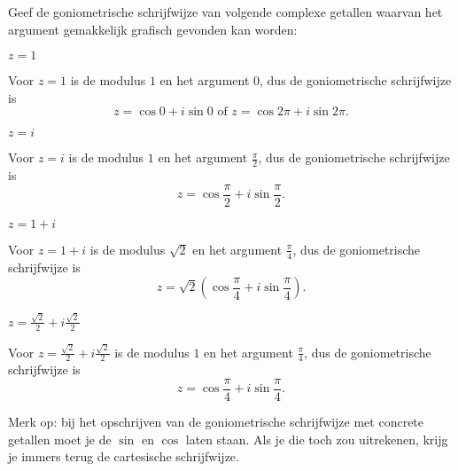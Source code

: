 \documentclass{ximera}
\begin{document}
\begin{exercise}\nl
    Geef de goniometrische schrijfwijze van volgende complexe getallen waarvan het argument gemakkelijk grafisch gevonden kan worden:
    \begin{question} $z=1 $
        \begin{oplossing}
          Voor $z=1 $ is de modulus $1$ en het argument $0$, dus de goniometrische schrijfwijze is $$z= \cos 0 + i\sin 0 \text{  of  } z= \cos 2\pi + i\sin 2\pi.$$
        \end{oplossing}
    \end{question}
\begin{question} $z=i $
    \begin{oplossing}
     Voor $z=i $ is de modulus $1$ en het argument $\frac{\pi}{2}$, dus de goniometrische schrijfwijze is $$z= \cos\frac{\pi}{2} + i \sin \frac{\pi}{2}.$$  
    \end{oplossing}
\end{question}
    \begin{question} $z=1+i$
        \begin{oplossing}
            Voor $z=1+i$ is de modulus $\sqrt{2}$ en het argument $\frac{\pi}{4}$, dus de goniometrische schrijfwijze is $$z= \sqrt{2}(\cos \frac{\pi}{4}+i\sin\frac{\pi}{4}).$$ 
        \end{oplossing}
    \end{question}
    \begin{question} $z=\frac{\sqrt2}{2}+i\frac{\sqrt2}{2}$
        \begin{oplossing}
            Voor $z=\frac{\sqrt2}{2}+i\frac{\sqrt2}{2}$ is de modulus $1$ en het argument $\frac{\pi}{4}$, dus de goniometrische schrijfwijze is $$z = \cos \frac{\pi}{4}+i\sin\frac{\pi}{4}.$$
        \end{oplossing}
    \end{question}
     
    Merk op: bij het opschrijven van de goniometrische schrijfwijze met concrete getallen moet je de $\sin$ en $\cos$ laten staan. Als je die toch zou uitrekenen, krijg je immers terug de cartesische schrijfwijze.
\end{exercise}
 


 
 
\end{document}
